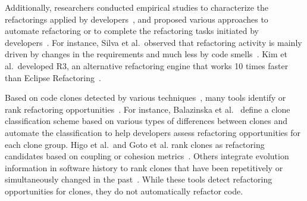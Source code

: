 \documentclass[runningheads,a4paper]{llncs}
\begin{document}
Additionally, researchers conducted empirical studies to characterize the refactorings applied by developers~\cite{Kim2012:FSR,Murphy-Hill2012:refactor,Vakilian:2012,Silva2016:WWR}, and proposed various approaches to automate refactoring or to complete the refactoring tasks initiated by developers~\cite{Griswold:1992,Balazinska1999,Dig:2009,Ge:2012,Chen:2013,Lee:2013,Tsantalis2013:icsm,Meng2015:ARO,Kim:2016}. For instance, Silva et al.~observed that refactoring activity is mainly driven by changes in the requirements and much less by code smells~\cite{Silva2016:WWR}. Kim et al.~developed R3, an alternative refactoring engine that works 10 times faster than Eclipse Refactoring~\cite{Kim:2016}. 

Based on code clones detected by various techniques~\cite{Kamiya2002,Jiang2007a,Krinke2001:PDG}, many tools identify or rank refactoring opportunities~\cite{Balazinska1999a, Higo2008:metricrefactoring, goto2013extract, higo2013identifying, Tsantalis2011:rankRefactoring}. For instance, Balazinska et al.~\cite{Balazinska1999a} define a clone classification scheme based on various types of differences between clones and automate the classification to help developers assess refactoring opportunities for each clone group. Higo et al.~and Goto et al.\/ rank clones as refactoring candidates based on coupling or cohesion metrics~\cite{Higo2008:metricrefactoring,goto2013extract}. Others integrate evolution information in software history to rank clones that have been repetitively or simultaneously changed in the past~\cite{higo2013identifying, Tsantalis2011:rankRefactoring}. While these tools detect refactoring opportunities for clones, they do not automatically refactor code.
\end{document}
